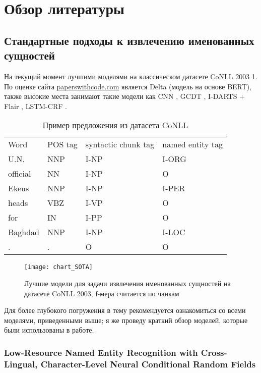 \section{Обзор литературы}

\subsection{Стандартные подходы к извлечению именованных сущностей}

На текущий момент лучшими моделями на классическом датасете CoNLL 2003 \cite{tjong-kim-sang-de-meulder-2003-introduction} \ref{table:example_CoNLL}. По оценке сайта \href{https://paperswithcode.com/sota/named-entity-recognition-ner-on-conll-2003}{paperswithcode.com} является Delta \cite{delta} (модель на основе BERT), также высокие места занимают такие модели как CNN \cite{CNN_top_2_SOTA}, GCDT \cite{Liu:19}, I-DARTS + Flair \cite{jiang-etal-2019-improved}, LSTM-CRF \cite{strakova-etal-2019-neural}.

\begin{table}[h]
\caption{Пример предложения из датасета CoNLL}
\begin{tabular}{llll}
Word & POS tag & syntactic chunk tag & named entity tag \\
U.N. & NNP & I-NP & I-ORG \\
official & NN & I-NP & O \\
Ekeus & NNP & I-NP& I-PER \\
heads & VBZ & I-VP & O\\
for & IN & I-PP & O \\
Baghdad & NNP & I-NP & I-LOC \\
. & . & O & O
\end{tabular}
\label{table:example_CoNLL}
\end{table}

\begin{figure}[h]
\texttt{[image: chart\_SOTA]}
\label{fig:chart_SOTA}
\caption{Лучшие модели для задачи извлечения именованных сущностей на датасете CoNLL 2003, f-мера считается по чанкам}
\end{figure}

Для более глубокого погружения в тему рекомендуется ознакомиться со всеми моделями, приведенными выше; я же проведу краткий обзор моделей, которые были использованы в работе.

\subsubsection{Low-Resource Named Entity Recognition with Cross-Lingual, Character-Level Neural Conditional Random Fields}

